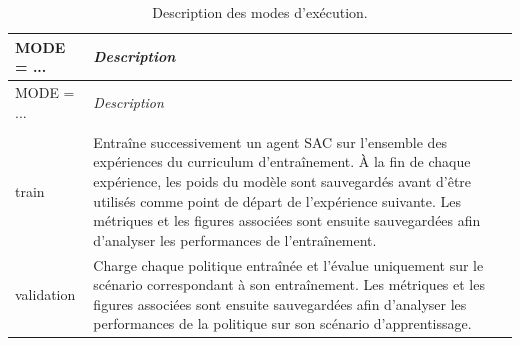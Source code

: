 \begin{longtable}{
        >{\ttfamily\small}p{}
        p{}
    }
    \caption{Description des modes d'exécution.}
    \label{tab:execution_mode}                                                                                                                                                                                                                                                                                                                                                    \\

    \toprule
    MODE = ... & \textit{Description}                                                                                                                                                                                                                                                                                                                                             \\
    \midrule
    \endfirsthead

    \toprule
    MODE = ... & \textit{Description}                                                                                                                                                                                                                                                                                                                                             \\
    \midrule
    \endhead

    \midrule
    \\
    \endfoot

    \bottomrule
    \endlastfoot

    train
               & Entraîne successivement un agent SAC sur l'ensemble des expériences du curriculum d'entraînement. À la fin de chaque expérience, les poids du modèle sont sauvegardés avant d'être utilisés comme point de départ de l'expérience suivante. Les métriques et les figures associées sont ensuite sauvegardées afin d'analyser les performances de l'entraînement. \\

    validation
               & Charge chaque politique entraînée et l'évalue uniquement sur le scénario correspondant à son entraînement. Les métriques et les figures associées sont ensuite sauvegardées afin d'analyser les performances de la politique sur son scénario d'apprentissage.                                                                                                   \\


\end{longtable}
